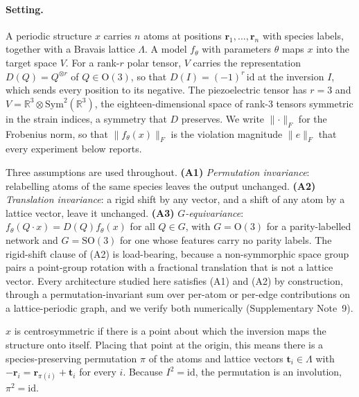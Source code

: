 \paragraph{Setting.} A periodic structure $x$ carries $n$ atoms at positions $\mathbf{r}_1,\dots,\mathbf{r}_n$ with species labels, together with a Bravais lattice $\Lambda$. A model $f_\theta$ with parameters $\theta$ maps $x$ into the target space $V$. For a rank-$r$ polar tensor, $V$ carries the representation $D(Q) = Q^{\otimes r}$ of $Q \in \mathrm{O}(3)$, so that $D(I) = (-1)^{r}\,\mathrm{id}$ at the inversion $I$, which sends every position to its negative. The piezoelectric tensor has $r = 3$ and $V = \mathbb{R}^{3}\otimes\mathrm{Sym}^{2}(\mathbb{R}^{3})$, the eighteen-dimensional space of rank-3 tensors symmetric in the strain indices, a symmetry that $D$ preserves. We write $\lVert\cdot\rVert_F$ for the Frobenius norm, so that $\lVert f_\theta(x)\rVert_F$ is the violation magnitude $\lVert e \rVert_F$ that every experiment below reports.

Three assumptions are used throughout. \textbf{(A1)} \emph{Permutation invariance}: relabelling atoms of the same species leaves the output unchanged. \textbf{(A2)} \emph{Translation invariance}: a rigid shift by any vector, and a shift of any atom by a lattice vector, leave it unchanged. \textbf{(A3)} \emph{$G$-equivariance}: $f_\theta(Q\!\cdot\!x)=D(Q)f_\theta(x)$ for all $Q\in G$, with $G=\mathrm{O}(3)$ for a parity-labelled network and $G=\mathrm{SO}(3)$ for one whose features carry no parity labels. The rigid-shift clause of (A2) is load-bearing, because a non-symmorphic space group pairs a point-group rotation with a fractional translation that is not a lattice vector. Every architecture studied here satisfies (A1) and (A2) by construction, through a permutation-invariant sum over per-atom or per-edge contributions on a lattice-periodic graph, and we verify both numerically (Supplementary Note~9).

\begin{definition}\label{def:centro}
$x$ is centrosymmetric if there is a point about which the inversion maps the structure onto itself. Placing that point at the origin, this means there is a species-preserving permutation $\pi$ of the atoms and lattice vectors $\mathbf{t}_i \in \Lambda$ with $-\mathbf{r}_i = \mathbf{r}_{\pi(i)} + \mathbf{t}_i$ for every $i$. Because $I^2 = \mathrm{id}$, the permutation is an involution, $\pi^{2} = \mathrm{id}$.
\end{definition}

